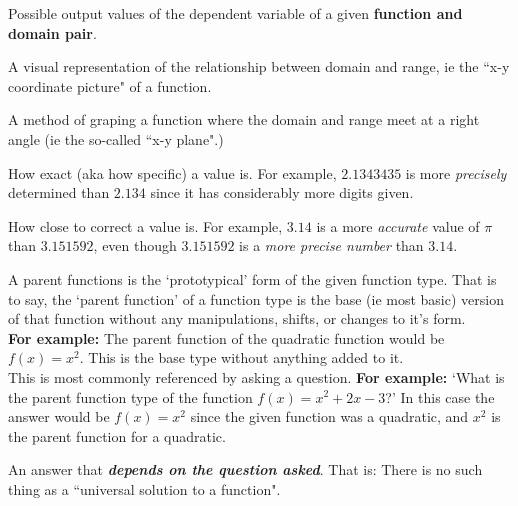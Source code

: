 \documentclass{ximeraXloud}
\begin{document}
\begin{definition}[Range]
    Possible output values of the dependent variable of a given \textbf{function and domain pair}.
\end{definition}

\begin{definition}
    A visual representation of the relationship between domain and range, ie the ``x-y coordinate picture" of a function.
\end{definition}

\begin{definition}
    A method of graping a function where the domain and range meet at a right angle (ie the so-called ``x-y plane".)
\end{definition}

\begin{definition}[Precision]
    How exact (aka how specific) a value is. For example, $2.1343435$ is more \emph{precisely} determined than $2.134$ since it has considerably more digits given.
\end{definition}

\begin{definition}[Accuracy]
    How close to correct a value is. For example, $3.14$ is a more \emph{accurate} value of $\pi$ than $3.151592$, even though $3.151592$ is a \emph{more precise number} than $3.14$.
\end{definition}

\begin{definition}
    A parent functions is the `prototypical' form of the given function type. That is to say, the `parent function' of a function type is the base (ie most basic) version of that function without any manipulations, shifts, or changes to it's form. \\
    \textbf{For example:} The parent function of the quadratic function would be $f(x) = x^2$. This is the base type without anything added to it.\\
    This is most commonly referenced by asking a question. \textbf{For example:} `What is the parent function type of the function $f(x) = x^2 + 2x - 3$?' In this case the answer would be $f(x) = x^2$ since the given function was a quadratic, and $x^2$ is the parent function for a quadratic.
\end{definition}

\begin{definition}[Solution]
    An answer that \textbf{\emph{depends on the question asked}}. That is: There is no such thing as a ``universal solution to a function".
\end{definition}
\end{document}

